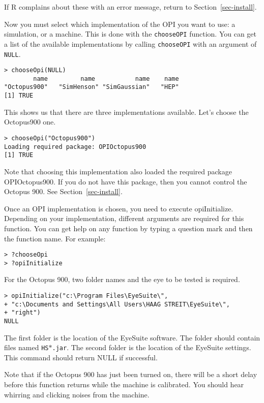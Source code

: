 \documentclass{article}
\begin{document}
If R complains about these with an error message, return to Section~\ref{sec-install}.

Now you must select which implementation of the OPI you want to
use: a simulation, or a machine. This is done with the {\tt chooseOPI}
function. You can get a list of the available implementations by
calling {\tt chooseOPI} with an argument of {\tt NULL}.

\begin{verbatim}
> chooseOpi(NULL)
        name         name           name    name 
"Octopus900"   "SimHenson" "SimGaussian"   "HEP"
[1] TRUE
\end{verbatim}

This shows us that there are three implementations available. Let’s choose
the Octopus900 one.

\begin{verbatim}
> chooseOpi("Octopus900") 
Loading required package: OPIOctopus900 
[1] TRUE
\end{verbatim}

Note that choosing this implementation also loaded the required package
OPIOctopus900. If you do not have this package, then you cannot control the
Octopus 900. See Section~\ref{sec-install}.

Once an OPI implementation is chosen, you need to execute opiInitialize.
Depending on your implementation, different arguments are required for this
function. You can get help on any function by typing a question mark and
then the function name. For example:

\begin{verbatim}
> ?chooseOpi
> ?opiInitialize
\end{verbatim}

For the Octopus 900, two folder names and the eye to be tested is required.
\begin{verbatim}
> opiInitialize("c:\Program Files\EyeSuite\",
+ "c:\Documents and Settings\All Users\HAAG STREIT\EyeSuite\",
+ "right")
NULL
\end{verbatim}
The first folder is the location of the EyeSuite software. The folder should contain files
named {\tt HS$\ast$.jar}.
The second folder is the location of the EyeSuite settings.
This command should return NULL if successful.

Note that if the Octopus 900 has just been turned on, there will
be a short delay before this function returns while the machine is
calibrated. You should hear whirring and clicking noises from the machine.
\end{document}
